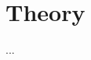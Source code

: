 \section{Theory}
...
\cite{doi:10.1021/acs.nanolett.9b03928}
\cite{doi:10.1021/acsphotonics.7b00103}
\cite{doi:10.1063/1.4921405}